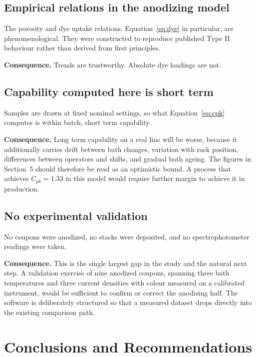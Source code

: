 \documentclass[11pt,a4paper]{article}
\newcommand{\Cpk}{\ensuremath{C_{pk}}}
\begin{document}
\subsection{Empirical relations in the anodizing model}

The porosity and dye uptake relations, Equation~\eqref{eq:dye} in particular,
are phenomenological. They were constructed to reproduce published Type II
behaviour rather than derived from first principles.

\textbf{Consequence.} Trends are trustworthy. Absolute dye loadings are not.

\subsection{Capability computed here is short term}

Samples are drawn at fixed nominal settings, so what
Equation~\eqref{eq:cpk} computes is within batch, short term capability.

\textbf{Consequence.} Long term capability on a real line will be worse,
because it additionally carries drift between bath changes, variation with rack
position, differences between operators and shifts, and gradual bath ageing.
The figures in Section~5 should therefore be read as an optimistic bound. A
process that achieves $\Cpk = 1.33$ in this model would require further margin
to achieve it in production.

\subsection{No experimental validation}

No coupons were anodized, no stacks were deposited, and no spectrophotometer
readings were taken.

\textbf{Consequence.} This is the single largest gap in the study and the
natural next step. A validation exercise of nine anodized coupons, spanning
three bath temperatures and three current densities with colour measured on a
calibrated instrument, would be sufficient to confirm or correct the anodizing
half. The software is deliberately structured so that a measured dataset drops
directly into the existing comparison path.

\section{Conclusions and Recommendations}
\end{document}
